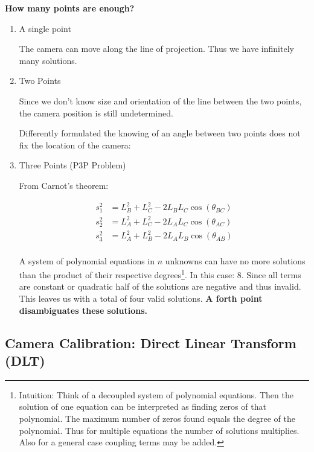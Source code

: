 \documentclass[10pt,a4paper]{scrartcl}
\begin{document}
\begin{multicols*}{2}
\textbf{How many points are enough?}

\begin{enumerate}
\item A single point


The camera can move along the line of projection. Thus we have infinitely many solutions.

\item Two Points


Since we don't know size and orientation of the line between the two points, the camera position is still undetermined.

Differently formulated the knowing of an angle between two points does not fix the location of the camera:


\item Three Points (P3P Problem)


From Carnot's theorem:

\begin{align*}
s_1^2&=L_B^2+L_C^2-2L_BL_C\cos(\theta_{BC})\\
s_2^2&=L_A^2+L_C^2-2L_AL_C\cos(\theta_{AC})\\
s_3^2&=L_A^2+L_B^2-2L_AL_B\cos(\theta_{AB})\\
\end{align*}

A system of polynomial equations in $n$ unknowns can have no more solutions than the product of their respective degrees\footnote{Intuition: Think of a decoupled system of polynomial equations. Then the solution of one equation can be interpreted as finding zeros of that polynomial. The maximum number of zeros found equals the degree of the polynomial. Thus for multiple equations the number of solutions multiplies. Also for a general case coupling terms may be added.}. In this case: $8$. Since all terms are constant or quadratic half of the solutions are negative and thus invalid. This leaves us with a total of four valid solutions. \textbf{A forth point disambiguates these solutions.}

\end{enumerate}

\subsection{Camera Calibration: Direct Linear Transform (DLT)} \label{sec:DLT}


\end{multicols*}
\end{document}
